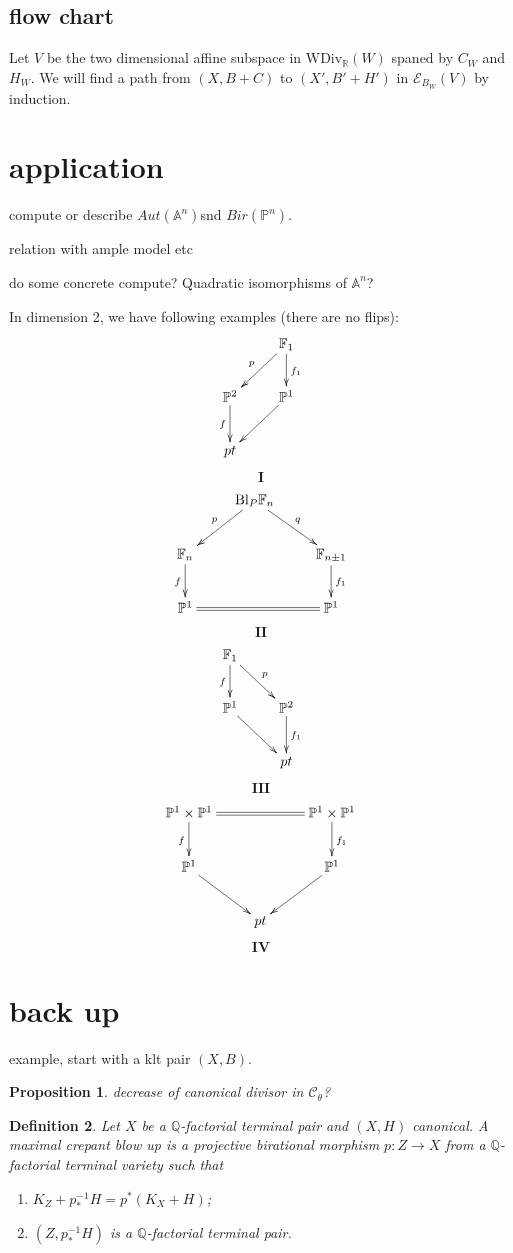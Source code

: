 \documentclass{article}
\newtheorem{defn}{Definition}[section]
\newtheorem{prop}[defn]{Proposition}
\begin{document}
\subsection{flow chart}
Let $ V $ be the two dimensional affine subspace in $ \mathrm{WDiv}_\mathbb{R}(W) $ spaned by $ C_W $ and $ H_W $. We will find a path from $ (X,B+C) $ to $ (X',B'+H') $ in $ \mathcal{E}_{B_W}(V) $ by induction.
\section{application}
compute or describe $ Aut(\mathbb{A}^n) $snd $ Bir(\mathbb{P}^n) $.

relation with ample model etc

do some concrete compute?  Quadratic isomorphisms of $ \mathbb{A}^n $?


In dimension 2, we have following examples (there are no flips):
$$ \xymatrix{
  &\mathbb{F}_1\ar[ld]_p\ar[d]^{f_1}\\
  \mathbb{P}^2\ar[d]_f&\mathbb{P}^1\ar[ld]\\
  pt &}$$
$$ \textbf{I} $$
$$ \xymatrix{
  &\mathrm{Bl}_P\mathbb{F}_n\ar[ld]_p\ar[rd]^q&\\
  \mathbb{F}_n\ar[d]_f&&\mathbb{F}_{n\pm 1}\ar[d]^{f_1}\\
  \mathbb{P}^1 &&\mathbb{P}^1\ar@{=}[ll]}$$
$$ \textbf{II} $$
$$ \xymatrix{
  \mathbb{F}_1\ar[d]_f\ar[rd]^{p}&\\
  \mathbb{P}^1\ar[rd]&\mathbb{P}^2\ar[d]^{f_1}\\
  &pt}$$
$$ \textbf{III} $$
$$ \xymatrix{
  \mathbb{P}^1\times \mathbb{P}^1\ar@{=}[rr]\ar[d]_f&&\mathbb{P}^1\times \mathbb{P}^1\ar[d]^{f_1}\\
  \mathbb{P}^1\ar[rd]&&\mathbb{P}^1\ar[ld]\\
  &pt&}$$
$$ \textbf{IV} $$


\section{back up}

example, start with a klt pair $ (X,B) $.

\begin{prop}
  decrease of canonical divisor in $ \mathcal{C}_\theta $?
\end{prop}

\begin{defn}
  Let $ X$ be a $ \mathbb{Q} $-factorial terminal pair and $ (X,H) $ canonical. A \textit{maximal crepant blow up} is a projective birational morphism $ p:Z\to X $ from a $ \mathbb{Q} $-factorial terminal variety such that
  \begin{enumerate}
    \item $ K_Z+p^{-1}_*H=p^*(K_X+H) $;
    \item $ (Z,p^{-1}_*H) $ is a $ \mathbb{Q} $-factorial terminal pair.
  \end{enumerate}  
\end{defn}
\end{document}
